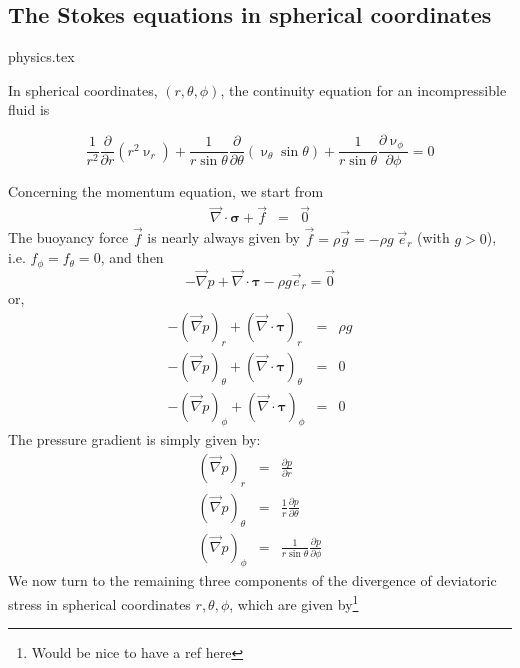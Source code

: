\subsection{The Stokes equations in spherical coordinates}
\begin{flushright} {\tiny {\color{gray} physics.tex}} \end{flushright}

In spherical coordinates, $(r,\theta,\phi)$, the continuity equation for an incompressible fluid is 
\begin{mdframed}[backgroundcolor=blue!5]
\begin{equation}
\frac{1}{r^2} \frac{\partial}{\partial r} (r^2 \upnu_r) + 
\frac{1}{r \sin \theta} \frac{\partial}{\partial \theta} (\upnu_\theta \sin \theta)+
\frac{1}{r \sin \theta} \frac{\partial \upnu_\phi}{\partial \phi} = 0
\end{equation}
\end{mdframed}
Concerning the momentum equation, we start from 
\begin{eqnarray}
{\vec \nabla}\cdot {\bm \sigma} + {\vec f} &=& \vec{0} 
\end{eqnarray}
The buoyancy force $\vec{f}$ is nearly always given by 
$\vec{f}=\rho \vec{g} = - \rho g \; \vec{e}_r$ (with $g>0$), i.e. $f_\phi=f_\theta=0$, and then
\[
- {\vec \nabla}p + {\vec \nabla}\cdot {\bm \tau} - \rho g \vec{e}_r = \vec{0}
\]
or,
\begin{eqnarray}
- ({\vec \nabla}p)_r      + ({\vec \nabla}\cdot {\bm \tau})_r     &=& \rho {g} \nonumber\\
- ({\vec \nabla}p)_\theta + ({\vec \nabla}\cdot {\bm \tau})_\theta&=&0  \nonumber\\
- ({\vec \nabla}p)_\phi   + ({\vec \nabla}\cdot {\bm \tau})_\phi  &=&0  \nonumber
\end{eqnarray}
The pressure gradient is simply given by:
\begin{eqnarray}
({\vec \nabla}p)_r &=& \frac{\partial p}{\partial r}  \nonumber\\
({\vec \nabla}p)_\theta &=& \frac{1}{r}\frac{\partial p}{\partial \theta}  \nonumber\\
({\vec \nabla}p)_\phi &=& \frac{1}{r\sin\theta}\frac{\partial p}{\partial \phi}  \nonumber
\end{eqnarray}
We now turn to the remaining three components of the divergence of deviatoric stress in 
spherical coordinates $r,\theta,\phi$, which are given by\footnote{Would be nice to 
have a ref here} %

